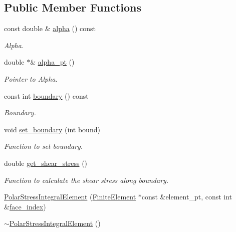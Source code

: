 \subsection*{Public Member Functions}
\begin{DoxyCompactItemize}
\item 
const double \& \hyperlink{classoomph_1_1PolarStressIntegralElement_a1a8b2e072b3dbfbfe755e6a6f1d5e051}{alpha} () const
\begin{DoxyCompactList}\small\item\em Alpha. \end{DoxyCompactList}\item 
double $\ast$\& \hyperlink{classoomph_1_1PolarStressIntegralElement_a8b0c1571618a9eb746769089d37c2b10}{alpha\+\_\+pt} ()
\begin{DoxyCompactList}\small\item\em Pointer to Alpha. \end{DoxyCompactList}\item 
const int \hyperlink{classoomph_1_1PolarStressIntegralElement_ad4e54b0d4f9c77c45554d16d4ec79f15}{boundary} () const
\begin{DoxyCompactList}\small\item\em Boundary. \end{DoxyCompactList}\item 
void \hyperlink{classoomph_1_1PolarStressIntegralElement_abf394e9cc6979cc711a27b66bb64a3de}{set\+\_\+boundary} (int bound)
\begin{DoxyCompactList}\small\item\em Function to set boundary. \end{DoxyCompactList}\item 
double \hyperlink{classoomph_1_1PolarStressIntegralElement_ae52aa0de04a32c399c59d66154739e3f}{get\+\_\+shear\+\_\+stress} ()
\begin{DoxyCompactList}\small\item\em Function to calculate the shear stress along boundary. \end{DoxyCompactList}\item 
\hyperlink{classoomph_1_1PolarStressIntegralElement_af36f7ba5ec7250370e99f378f183ba89}{Polar\+Stress\+Integral\+Element} (\hyperlink{classoomph_1_1FiniteElement}{Finite\+Element} $\ast$const \&element\+\_\+pt, const int \&\hyperlink{classoomph_1_1FaceElement_a478d577ac6db67ecc80f1f02ae3ab170}{face\+\_\+index})
\item 
\hyperlink{classoomph_1_1PolarStressIntegralElement_a4463b248acefefe8287450d9deef50cf}{$\sim$\+Polar\+Stress\+Integral\+Element} ()

\end{DoxyCompactItemize}
